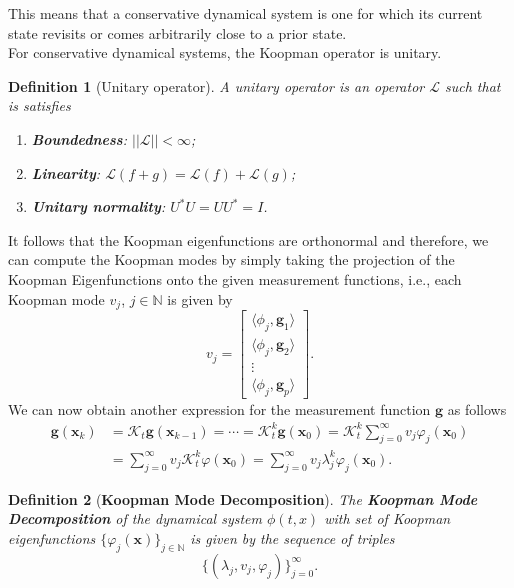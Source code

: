 \documentclass[]{article}
\newtheorem{definition}{Definition}
\begin{document}
This means that a conservative dynamical system is one for which its current state revisits or comes arbitrarily close to a prior state. \\
For conservative dynamical systems, the Koopman operator is unitary.
\begin{definition}[Unitary operator]
A unitary operator is an operator $\mathcal{L}$ such that is satisfies
\begin{enumerate}
	\item \textbf{Boundedness}: $||\mathcal{L}||<\infty$;
	\item \textbf{Linearity}: $\mathcal{L}(f+g)=\mathcal{L}(f)+\mathcal{L}(g)$;
	\item \textbf{Unitary normality}: $U^*U=UU^*=I$.
\end{enumerate}
\end{definition}
It follows that the Koopman eigenfunctions are orthonormal and therefore, we can compute the Koopman modes by simply taking the projection of the Koopman Eigenfunctions onto the given measurement functions, i.e., each Koopman mode $v_j$, $j \in \mathbb{N}$ is given by
\begin{equation}
	v_j = \begin{bmatrix}
		\langle \phi_j, \textbf{g}_1 \rangle \\
		\langle \phi_j, \textbf{g}_2 \rangle \\
		\vdots \\
		\langle \phi_j, \textbf{g}_p \rangle
	\end{bmatrix}.
\end{equation}
We can now obtain another expression for the measurement function $\textbf{g}$ as follows
\begin{equation}
	\begin{split}
		\textbf{g}(\textbf{x}_k) & = \mathcal{K}_t \textbf{g}(\textbf{x}_{k-1}) = \cdots = \mathcal{K}_t^k\textbf{g}(\textbf{x}_0) = \mathcal{K}_t^k \sum_{j=0}^{\infty} v_j \varphi_j (\textbf{x}_0) \\ & =
		\sum_{j=0}^{\infty} v_j \mathcal{K}_t^k \varphi(\textbf{x}_0) = \sum_{j=0}^{\infty} v_j \lambda_j^k \varphi_j(\textbf{x}_0).
	\end{split}
\end{equation}
\begin{definition}[\textbf{Koopman Mode Decomposition}]
The \textbf{Koopman Mode Decomposition} of the dynamical system $\phi(t,x)$ with set of Koopman eigenfunctions $\{\varphi_j(\textbf{x})\}_{j \in \mathbb{N}}$ is given by the sequence of triples
\begin{equation}
	\{(\lambda_j, v_j, \varphi_j)\}_{j=0}^{\infty}.
\end{equation}
\end{definition}
\end{document}
